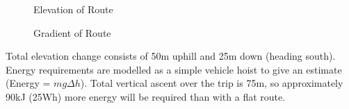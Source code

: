 \documentclass[journal,10pt]{IEEEtran}
\begin{document}
            \begin{figure}[H]
                \centering
                \caption{Elevation of Route}
                \label{fig:elevation}
            \end{figure}
            \begin{figure}[H]
                \centering
                \caption{Gradient of Route}
                \label{fig:gradient}
            \end{figure}
            Total elevation change consists of 50m uphill and 25m down (heading south). Energy requirements are modelled as a simple vehicle hoist to give an estimate (Energy = $mg\Delta h$). Total vertical ascent over the trip is 75m, so approximately 90kJ (25Wh) more energy will be required than with a flat route.
\end{document}
